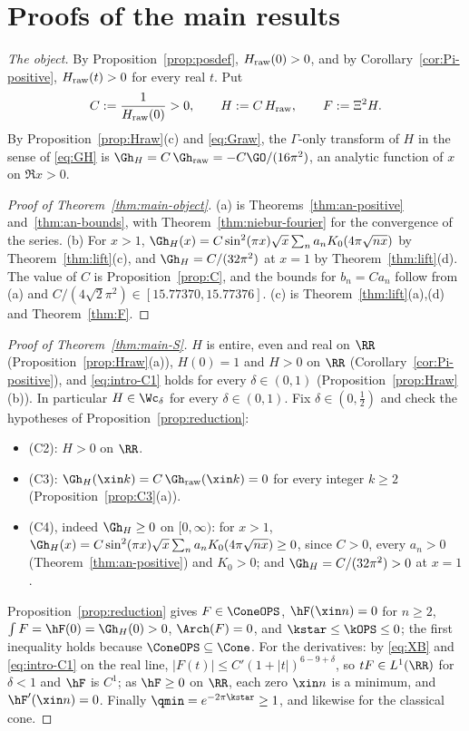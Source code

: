 \section{Proofs of the main results}\label{sec:assembly}

\emph{The object.} By Proposition~\ref{prop:posdef}, $H_{\rm raw}(0)>0$, and by Corollary~\ref{cor:Pi-positive}, $H_{\rm raw}(t)>0$ for every
real $t$. Put
\[
C:=\frac1{H_{\rm raw}(0)}>0,\qquad H:=C\,H_{\rm raw},\qquad F:=\Xi^2H .
\]
By Proposition~\ref{prop:Hraw}(c) and \eqref{eq:Graw}, the $\Gamma$-only transform of $H$ in the sense of \eqref{eq:GH} is
$\Gh_H=C\,\Gh_{\rm raw}=-C\GO/(16\pi^2)$, an analytic function of $x$ on $\Re x>0$.

\begin{proof}[Proof of Theorem~\textup{\ref{thm:main-object}}]
(a) is Theorems~\ref{thm:an-positive} and~\ref{thm:an-bounds}, with Theorem~\ref{thm:niebur-fourier} for the convergence of the series.
(b) For $x>1$, $\Gh_H(x)=C\sin^2(\pi x)\sqrt x\sum_na_nK_0(4\pi\sqrt{nx})$ by Theorem~\ref{thm:lift}(c), and $\Gh_H=C/(32\pi^2)$ at $x=1$ by
Theorem~\ref{thm:lift}(d). The value of $C$ is Proposition~\ref{prop:C}, and the bounds for $b_n=Ca_n$ follow from (a) and
$C/(4\sqrt2\pi^2)\in[15.77370,15.77376]$. (c) is Theorem~\ref{thm:lift}(a),(d) and Theorem~\ref{thm:F}.
\end{proof}

\begin{proof}[Proof of Theorem~\textup{\ref{thm:main-S}}]
$H$ is entire, even and real on $\RR$ (Proposition~\ref{prop:Hraw}(a)), $H(0)=1$ and $H>0$ on $\RR$ (Corollary~\ref{cor:Pi-positive}), and
\eqref{eq:intro-C1} holds for every $\delta\in(0,1)$ (Proposition~\ref{prop:Hraw}(b)). In particular $H\in\Wc_\delta$ for every $\delta\in(0,1)$.
Fix $\delta\in(0,\frac12)$ and check the hypotheses of Proposition~\ref{prop:reduction}:
\begin{itemize}
\item (C2): $H>0$ on $\RR$.
\item (C3): $\Gh_H(\xin k)=C\,\Gh_{\rm raw}(\xin k)=0$ for every integer $k\ge2$ (Proposition~\ref{prop:C3}(a)).
\item (C4), indeed $\Gh_H\ge0$ on $[0,\infty)$: for $x>1$, $\Gh_H(x)=C\sin^2(\pi x)\sqrt x\sum_na_nK_0(4\pi\sqrt{nx})\ge0$, since $C>0$, every
$a_n>0$ (Theorem~\ref{thm:an-positive}) and $K_0>0$; and $\Gh_H=C/(32\pi^2)>0$ at $x=1$.
\end{itemize}
Proposition~\ref{prop:reduction} gives $F\in\ConeOPS$, $\hF(\xin n)=0$ for $n\ge2$, $\int F=\hF(0)=\Gh_H(0)>0$, $\Arch(F)=0$, and
$\kstar\le\kOPS\le0$; the first inequality holds because $\ConeOPS\subseteq\Cone$. For the derivatives: by \eqref{eq:XB} and
\eqref{eq:intro-C1} on the real line, $|F(t)|\le C'(1+|t|)^{6-9+\delta}$, so $tF\in L^1(\RR)$ for $\delta<1$ and $\hF$ is $C^1$; as $\hF\ge0$ on $\RR$,
each zero $\xin n$ is a minimum, and $\hF'(\xin n)=0$. Finally $\qmin=e^{-2\pi\kstar}\ge1$, and likewise for the classical cone.
\end{proof}

